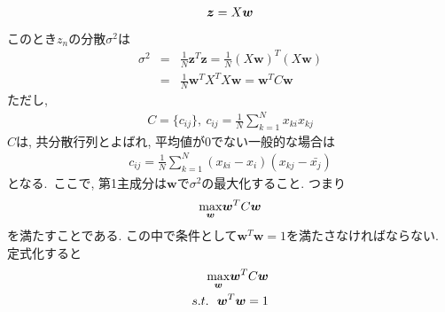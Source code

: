 \documentclass[dvipdfmx,a4j]{jsarticle}
\begin{document}
  \begin{eqnarray*}
    \mbox{\boldmath $z$}=X\mbox{\boldmath $w$}
  \end{eqnarray*}
  このとき$z_{n}$の分散$\sigma^{2}$は
  \begin{eqnarray*}
    \sigma^{2}&=&\frac{1}{N}\bm{z}^{T}\bm{z}=\frac{1}{N}(X\bm{w})^{T}(X\bm{w})\\
              &=&\frac{1}{N}\bm{w}^{T}X^{T}X\bm{w}=\bm{w}^{T}C\bm{w}
  \end{eqnarray*}
  ただし,
  \begin{eqnarray*}
    C=\{c_{ij}\},\ c_{ij}=\frac{1}{N}\sum_{k=1}^{N}x_{ki}x_{kj}
  \end{eqnarray*}
  $C$は, 共分散行列とよばれ, 平均値が0でない一般的な場合は
  \begin{eqnarray*}
    c_{ij}=\frac{1}{N}\sum_{k=1}^{N}(x_{ki}-{x_{i}})(x_{kj}-\bar{x_{j}})
  \end{eqnarray*}
  となる.\ ここで, 第1主成分は$\bm{w}$で$\sigma^{2}$の最大化すること. つまり
  \begin{eqnarray*}
    \underset{\bm{w}}{\rm max}\bm{w}^{T}C\bm{w}
  \end{eqnarray*}
  を満たすことである. この中で条件として$\bm{w}^{T}\bm{w}=1$を満たさなければならない. 定式化すると
  \begin{eqnarray*}
    \underset{\bm{w}}{\rm max}\bm{w}^{T}C\bm{w}\\
    s.t.\ \ \bm{w}^{T}\bm{w}=1
  \end{eqnarray*}
\end{document}
